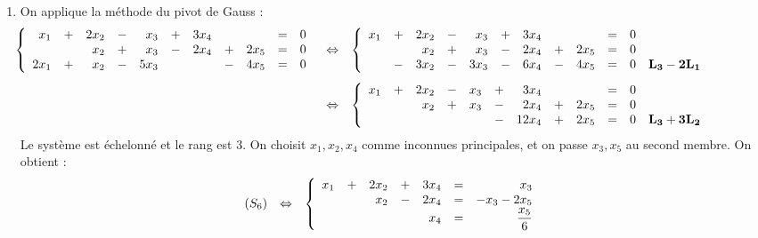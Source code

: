 \documentclass[a4paper, 11pt,reqno]{article}
\begin{document}
\begin{correction}
\begin{enumerate}
$$\begin{array}{rcl}
\begin{array}{rcrcrcrl}
& &3y &-& 4x & = &-2& \mathbf{L_3 \leftarrow L_3-L_1}\\
\end{array}\right.
\end{array}$$
Le rang est \'echelonn\'e et de rang 3. On obtient en remontant les \'equations : $\fbox{$ \mathcal{S}=\left\lbrace  \left( \ddp\frac{3}{4},\ddp\frac{1}{3},\ddp\frac{37}{12}  \right) \right\rbrace $}$.
\item  On applique la m\'ethode du pivot de Gauss :
$$\hspace*{-1.75cm}\begin{array}{rcl}
\left\lbrace\begin{array}{rcrcrcrcrcr}
x_1 &+ &2x_2 &- & x_3 &+& 3x_4& & & = &0\\
 & & x_2 &+ &x_3 &- & 2x_4 &+& 2x_5& = &0\\
2x_1 &+ &x_2 &- & 5x_3  & & &-& 4x_5& = &0\\
\end{array}\right.
& \Leftrightarrow &
\left\lbrace\begin{array}{rcrcrcrcrcrl}
x_1 &+ &2x_2 &- & x_3 &+& 3x_4& & & = &0\\
 & & x_2 &+ &x_3 &- & 2x_4 &+& 2x_5& = &0\\
&-&3x_2 &- & 3x_3  &- & 6x_4&-& 4x_5& = &0& \mathbf{L_3-2L_1}\\
\end{array}\right.\vsec\\
& \Leftrightarrow &
\left\lbrace\begin{array}{rcrcrcrcrcrl}
x_1 &+ &2x_2 &- & x_3 &+& 3x_4& & & = &0\\
 & & x_2 &+ &x_3 &- & 2x_4 &+& 2x_5& = &0\\
&&&& &- & 12x_4&+& 2x_5& = &0& \mathbf{L_3+3L_2}\\
\end{array}\right.
\end{array}$$
Le syst\`eme est \'echelonn\'e et le rang est 3. On choisit $x_1,x_2,x_4$ comme inconnues principales, et on passe $x_3, x_5$ au second membre. On obtient :
$$\begin{array}{rcl}
(S_6)
& \Leftrightarrow &
\left\lbrace\begin{array}{rcrcrcrcrcrl}
x_1 &+ &2x_2 &+ & 3x_4 & = &x_3\\
 & & x_2 &- &2x_4 & = &-x_3 -2x_5\\
&&&& x_4  & = &\ddp \frac{x_5}{6}\\
\end{array}\right.\vsec\\

\end{array}$$
\end{enumerate}
\end{correction}
\end{document}
